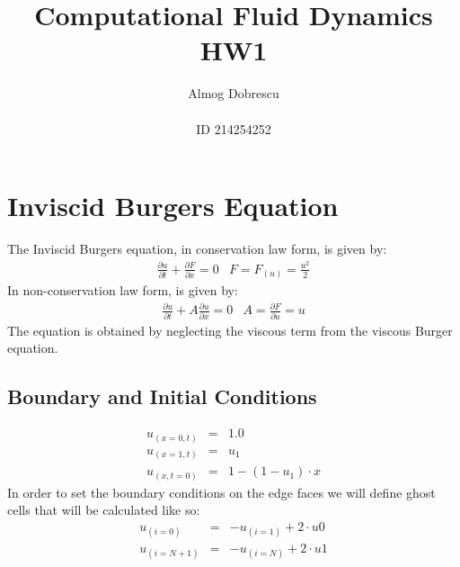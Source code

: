 \documentclass[11pt, a4paper]{article}
\title{Computational Fluid Dynamics \\ HW1}
\author{Almog Dobrescu\\\\ID 214254252}
\begin{document}
\maketitle
\thispagestyle{empty}
\newpage

\setcounter{page}{1}
\tableofcontents
\vfil
\listoffigures
\newpage

\section{Inviscid Burgers Equation}
The Inviscid Burgers equation, in conservation law form, is given by:
\begin{equation}
    \begin{array}{cc}
        \displaystyle\frac{\partial u}{\partial t} + \frac{\partial F}{\partial x} = 0 & F = \displaystyle F_{(u)} = \frac{u^2}{2}
    \end{array}
\end{equation} 
In non-conservation law form, is given by:
\begin{equation}
    \begin{array}{cc}
        \displaystyle\frac{\partial u}{\partial t} + A\frac{\partial u}{\partial x} = 0 & A = \displaystyle \frac{\partial F}{\partial u} = u
    \end{array}
\end{equation}
The equation is obtained by neglecting the viscous term from the viscous Burger equation.

\subsection{Boundary and Initial Conditions}
\begin{equation}
    \begin{array}{lcl}
        u_{(x=0,t)} & = & 1.0 \\
        u_{(x=1,t)} & = & u_1 \\
        u_{(x,t=0)} & = & 1-(1-u_1)\cdot x
    \end{array}
\end{equation}
In order to set the boundary conditions on the edge faces we will define ghost cells that will be calculated like so:
\begin{equation}
    \begin{array}{lcl}
        u_{\left(i=0\right)}&=&-u_{\left(i=1\right)}+2\cdot u0 \\
        u_{\left(i=N+1\right)}&=&-u_{\left(i=N\right)}+2\cdot u1 
    \end{array}
\end{equation}
\end{document}
